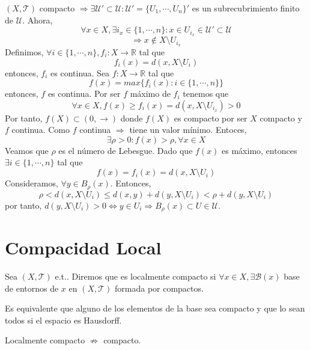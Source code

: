 \begin{dem}
  $( X, \mathcal{T} )$ compacto $\Rightarrow \exists \mathcal{U}' \subset \mathcal{U} : \mathcal{U}' = \{ U_{1}, \cdots, U_{n} \}'$ es un subrecubrimiento finito de $\mathcal{U}$. Ahora,
  \[ 
    \forall x \in X, \exists i_{x} \in \{ 1, \cdots, n \} : x \in U_{i_{x}} \in \mathcal{U}' \subset \mathcal{U}
  \]  
  \[ 
    \Rightarrow x \not \in X \setminus U_{i_{x}} 
  \] 
  Definimos, $\forall i \in \{ 1, \cdots, n \}, f_{i} :  X \to \mathbb{R}$ tal que
  \[
    f_{i}(x) = d(x, X \setminus U_{i})
  \]
  entonces, $f_{i}$ es continua. Sea $f : X \to \mathbb{R}$ tal que 
  \[ 
    f(x) = max \{ f_{i}(x) : i \in \{ 1, \cdots, n \} \} 
  \] 
  entonces, $f$ es continua. Por ser $f$ máximo de $f_{i}$ tenemos que
  \[ 
    \forall x \in X, f(x) \geq f_{i}(x) = d(x, X \setminus U_{i_{x}})  > 0
  \] 
  Por tanto, $f(X) \subset (0, \rightarrow)$ donde $f(X)$ es compacto por ser $X$ compacto y $f$ continua. Como $f$ continua $\Rightarrow$ tiene un valor mínimo. Entoces,
  \[ 
    \exists \rho > 0 : f(x) > \rho, \forall x \in X 
  \] 
  Veamos que $\rho$ es el número de Lebesgue. Dado que $f(x)$ es máximo, entonces $\exists i \in \{ 1, \cdots, n \}$ tal que
  \[ 
    f(x) = f_{i}(x) = d(x, X \setminus U_{i}) 
  \] 
  Consideramos, $\forall y \in B_{\rho}(x)$. Entonces,
  \[ 
    \rho < d(x, X \setminus U_{i}) \leq d(x, y) + d(y, X \setminus U_{i}) < \rho + d(y, X \setminus U_{i}) 
  \] 
  por tanto, $d(y, X \setminus U_{i}) > 0 \Leftrightarrow y \in U_{i} \Rightarrow B_{\rho}(x) \subset U \in \mathcal{U}$.
\end{dem}

\section{Compacidad Local}

\begin{defn}
  Sea $( X, \mathcal{T} )$ e.t.. Diremos que es localmente compacto si $\forall x \in X, \exists \mathcal{B}(x)$ base de entornos de $x$ en $( X, \mathcal{T} )$ formada por compactos.
\end{defn}

\begin{obs}
  Es equivalente que alguno de los elementos de la base sea compacto y que lo sean todos si el espacio es Hausdorff.
\end{obs}

\begin{obs}
  Localmente compacto $\not \Rightarrow$ compacto.
\end{obs}


